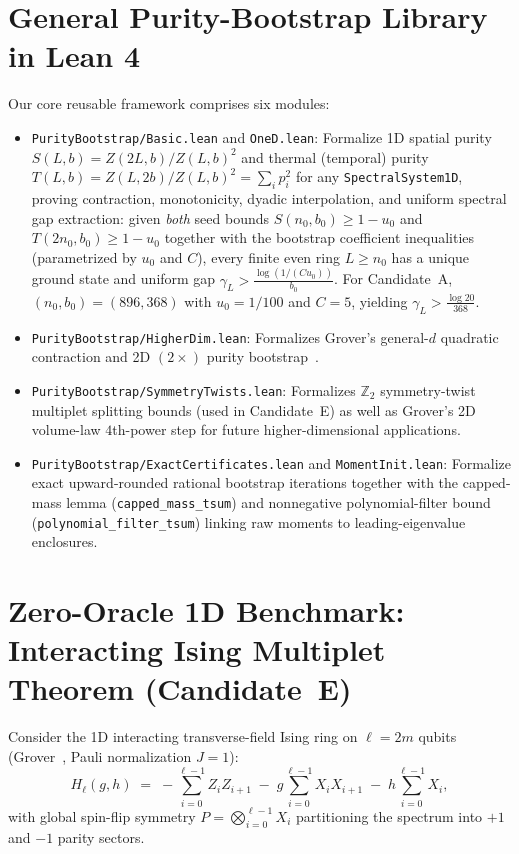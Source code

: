 \documentclass[11pt,a4paper]{article}
\newcommand{\id}[1]{{\small\nolinkurl{#1}}}
\newcommand{\Z}{\mathbb{Z}}
\begin{document}
\section{General Purity-Bootstrap Library in Lean 4}
Our core reusable framework comprises six modules:
\begin{itemize}[leftmargin=1.6em,itemsep=2pt]
  \item \id{PurityBootstrap/Basic.lean} and \id{OneD.lean}: Formalize 1D spatial purity $S(L, b) = Z(2L, b)/Z(L, b)^2$ and thermal (temporal) purity $T(L, b) = Z(L, 2b)/Z(L, b)^2 = \sum_i p_i^2$ for any \id{SpectralSystem1D}, proving contraction, monotonicity, dyadic interpolation, and uniform spectral gap extraction: given \emph{both} seed bounds $S(n_0, b_0) \ge 1 - u_0$ and $T(2n_0, b_0) \ge 1 - u_0$ together with the bootstrap coefficient inequalities (parametrized by $u_0$ and $C$), every finite even ring $L \ge n_0$ has a unique ground state and uniform gap $\gamma_L > \frac{\log(1/(C u_0))}{b_0}$. For Candidate~A, $(n_0, b_0) = (896, 368)$ with $u_0 = 1/100$ and $C = 5$, yielding $\gamma_L > \frac{\log 20}{368}$.
  \item \id{PurityBootstrap/HigherDim.lean}: Formalizes Grover's general-$d$ quadratic contraction and 2D $(2\times)$ purity bootstrap~\cite{grover2026}.
  \item \id{PurityBootstrap/SymmetryTwists.lean}: Formalizes $\Z_2$ symmetry-twist multiplet splitting bounds (used in Candidate~E) as well as Grover's 2D volume-law $4$th-power step for future higher-dimensional applications.
  \item \id{PurityBootstrap/ExactCertificates.lean} and \id{MomentInit.lean}: Formalize exact upward-rounded rational bootstrap iterations together with the capped-mass lemma (\id{capped_mass_tsum}) and nonnegative polynomial-filter bound (\id{polynomial_filter_tsum}) linking raw moments to leading-eigenvalue enclosures.
\end{itemize}

\section{Zero-Oracle 1D Benchmark: Interacting Ising Multiplet Theorem (Candidate~E)}
Consider the 1D interacting transverse-field Ising ring on $\ell = 2m$ qubits (Grover~\cite{grover2026}, Pauli normalization $J = 1$):
\begin{equation}
  H_\ell(g, h) \;=\; -\sum_{i=0}^{\ell-1} Z_i Z_{i+1} \;-\; g \sum_{i=0}^{\ell-1} X_i X_{i+1} \;-\; h \sum_{i=0}^{\ell-1} X_i,
  \label{eq:ising}
\end{equation}
with global spin-flip symmetry $P = \bigotimes_{i=0}^{\ell-1} X_i$ partitioning the spectrum into $+1$ and $-1$ parity sectors.
\end{document}
